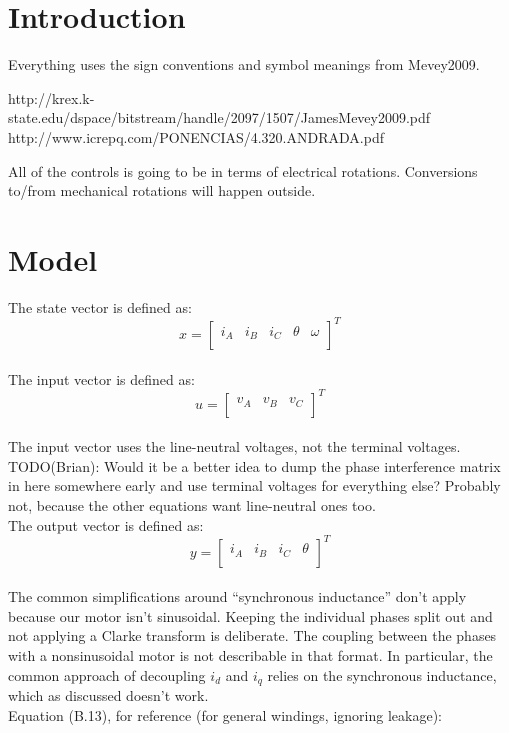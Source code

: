\documentclass[fleqn]{article}
\begin{document}
\begin{flushleft}

\section{Introduction}
Everything uses the sign conventions and symbol meanings from
Mevey2009.

http://krex.k-state.edu/dspace/bitstream/handle/2097/1507/JamesMevey2009.pdf
http://www.icrepq.com/PONENCIAS/4.320.ANDRADA.pdf

All of the controls is going to be in terms of electrical rotations. Conversions
to/from mechanical rotations will happen outside.

\section{Model}
The state vector is defined as:
\[x =
  \begin{bmatrix}
    i_A & i_B & i_C & \theta & \omega \\
  \end{bmatrix}
^T\]
\\
The input vector is defined as:
\[u =
  \begin{bmatrix}
    v_A & v_B & v_C \\
  \end{bmatrix}
^T\]
\\
The input vector uses the line-neutral voltages, not the terminal voltages.
TODO(Brian): Would it be a better idea to dump the phase interference matrix
in here somewhere early and use terminal voltages for everything else? Probably
not, because the other equations want line-neutral ones too.
\\
The output vector is defined as:
\[y =
  \begin{bmatrix}
    i_A & i_B & i_C & \theta \\
  \end{bmatrix}
^T\]
\\
The common simplifications around ``synchronous inductance'' don't apply because
our motor isn't sinusoidal.
Keeping the individual phases split out and not applying a Clarke transform is
deliberate. The coupling between the phases with a nonsinusoidal motor is not
describable in that format. In particular, the common approach of decoupling
$i_d$ and $i_q$ relies on the synchronous inductance, which as discussed doesn't
work.
\\
Equation (B.13), for reference (for general windings, ignoring leakage):

\end{flushleft}
\end{document}
